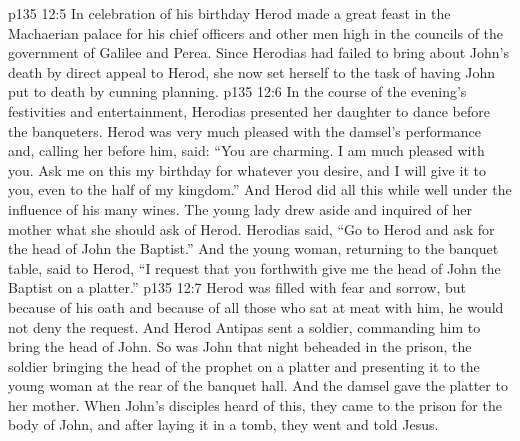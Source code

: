 \vs p135 12:5 \pc In celebration of his birthday Herod made a great feast in the Machaerian palace for his chief officers and other men high in the councils of the government of Galilee and Perea. Since Herodias had failed to bring about John’s death by direct appeal to Herod, she now set herself to the task of having John put to death by cunning planning.
\vs p135 12:6 In the course of the evening’s festivities and entertainment, Herodias presented her daughter to dance before the banqueters. Herod was very much pleased with the damsel’s performance and, calling her before him, said: “You are charming. I am much pleased with you. Ask me on this my birthday for whatever you desire, and I will give it to you, even to the half of my kingdom.” And Herod did all this while well under the influence of his many wines. The young lady drew aside and inquired of her mother what she should ask of Herod. Herodias said, “Go to Herod and ask for the head of John the Baptist.” And the young woman, returning to the banquet table, said to Herod, “I request that you forthwith give me the head of John the Baptist on a platter.”
\vs p135 12:7 Herod was filled with fear and sorrow, but because of his oath and because of all those who sat at meat with him, he would not deny the request. And Herod Antipas sent a soldier, commanding him to bring the head of John. So was John that night beheaded in the prison, the soldier bringing the head of the prophet on a platter and presenting it to the young woman at the rear of the banquet hall. And the damsel gave the platter to her mother. When John’s disciples heard of this, they came to the prison for the body of John, and after laying it in a tomb, they went and told Jesus.
\quizlink
